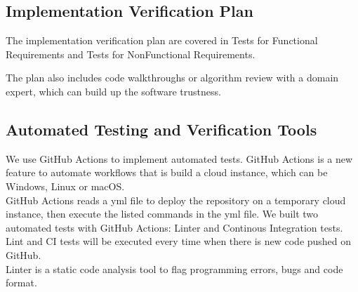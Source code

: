 \documentclass[12pt, titlepage]{article}
\begin{document}
\subsection{Implementation Verification Plan}
The implementation verification plan are covered in Tests for Functional Requirements and Tests for NonFunctional Requirements.

\noindent The plan also includes code walkthroughs or algorithm review with a domain expert, which can build up the software trustness.  
%


\subsection{Automated Testing and Verification Tools}


We use GitHub Actions to implement automated tests. GitHub Actions is a new feature to automate workflows that is build a cloud instance, which can be Windows, Linux or macOS. \\

\noindent GitHub Actions reads a yml file to deploy the repository on a temporary cloud instance, then execute the listed commands in the yml file. We built two automated tests with GitHub Actions: Linter and Continous Integration tests. Lint and CI tests will be executed every time when there is new code pushed on GitHub.\\

\noindent Linter is a static code analysis tool to flag programming errors, bugs and code format. \\
\end{document}
